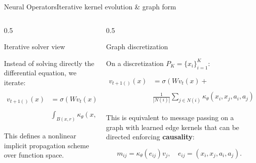\documentclass[aspectratio=169,t,11pt,table]{beamer}
{\setbeamercovered{transparent}}
\begin{document}

\begin{frame}{Neural Operators}{Iterative kernel evolution \& graph form}

\vspace{-0.7cm}
\begin{columns}[T]
\begin{column}{0.5\textwidth}
\begin{purpleBlock}{\centering\small{Iterative solver view}}

\tiny

Instead of solving directly the differential equation, we iterate:

\begin{align*}
         v_{t+1()}(x) & = \sigma\left(W v_t(x) + \right. \\
         & \left. \int_{B(x,r)} \kappa_\theta(x,y,a(x),a(y)) v_t(y)\, dy \right).
\end{align*}

This defines a nonlinear implicit propagation scheme over function space.

\end{purpleBlock}
\end{column}
\begin{column}{0.5\textwidth}
\begin{purpleBlock}{\centering\small{Graph discretization}}

\tiny

On a discretization $P_K = \{x_i\}_{i=1}^K$:

\begin{align*}
         v_{t+1()}(x) & = \sigma\left(W v_t(x) + \right. \\
         & \left. \frac{1}{|N(i)|} \sum_{j \in N(i)} \kappa_\theta(x_i,x_j,a_i,a_j)\, v_t(x_j) \right).
\end{align*}

This is equivalent to message passing on a graph with learned edge kernels that can be directed enforcing \textbf{causality}:

\[
m_{ij} = \kappa_\theta(e_{ij}) v_j,
\quad
e_{ij} = (x_i,x_j,a_i,a_j).
\]

\end{purpleBlock}
\end{column}
\end{columns}

\end{frame}
\end{document}
